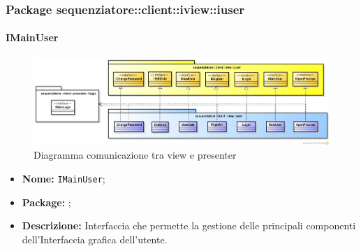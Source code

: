 \subsubsection{Package sequenziatore::client::iview::iuser}

\paragraph{IMainUser}
\begin{figure}[H] \centering \includegraphics[width=%
\textwidth]
{./pack/viewuser.png} \caption{Diagramma comunicazione tra view e presenter}
\end{figure}
\begin{itemize}
\item \textbf{Nome:} \texttt{IMainUser};
\item \textbf{Package:} \texttt{\iViewUser{}};
\item \textbf{Descrizione:} Interfaccia che permette la gestione delle principali componenti dell'Interfaccia grafica dell'utente.
\end{itemize}

